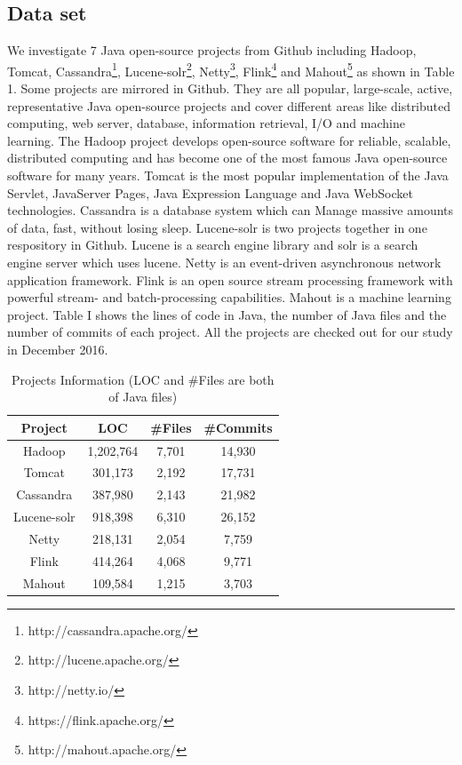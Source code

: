 \subsection{Data set}
\label{sec:method:data}
We investigate 7 Java open-source projects from Github including Hadoop, Tomcat, Cassandra\footnote{http://cassandra.apache.org/}, Lucene-solr\footnote{http://lucene.apache.org/}, Netty\footnote{http://netty.io/}, Flink\footnote{https://flink.apache.org/} and Mahout\footnote{http://mahout.apache.org/} as shown in Table 1. Some projects are mirrored in Github. They are all popular, large-scale, active, representative Java open-source projects and cover different areas like distributed computing, web server, database, information retrieval, I/O and machine learning. The Hadoop project develops open-source software for reliable, scalable, distributed computing and has become one of the most famous Java open-source software for many years. Tomcat is the most popular implementation of the Java Servlet, JavaServer Pages, Java Expression Language and Java WebSocket technologies. Cassandra \cite{journals/sigops/LakshmanM10} is a database system which can Manage massive amounts of data, fast, without losing sleep. Lucene-solr is two projects together in one respository in Github. Lucene is a search engine library and solr is a search engine server which uses lucene. Netty is an event-driven asynchronous network application framework. Flink is an open source stream processing framework with powerful stream- and batch-processing capabilities. Mahout is a machine learning project. Table I shows the lines of code in Java, the number of Java files and the number of commits of each project. All the projects are checked out for our study in December 2016.

\begin{table}
	\centering
	\caption{Projects Information (LOC and \#Files are both of Java files)}
	\begin{tabular}{|c|c|c|c|}\hline
		Project&LOC&\#Files&\#Commits\\\hline
		Hadoop&1,202,764&7,701&14,930\\\hline
		Tomcat&301,173&2,192&17,731\\\hline
		Cassandra&387,980&2,143&21,982\\\hline
		Lucene-solr&918,398&6,310&26,152\\\hline
		Netty&218,131&2,054&7,759\\\hline
		Flink&414,264&4,068&9,771\\\hline
		Mahout&109,584&1,215&3,703\\\hline
	\end{tabular}
\end{table}

